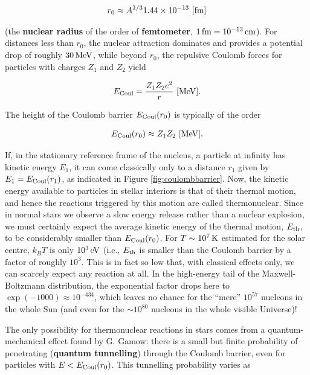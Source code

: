 \documentclass[a4paper,10pt]{article}
\begin{document}
\begin{align*}
    r_0 \approx A^{1/3}1.44\times10^{-13} ~ [{\rm fm}]
\end{align*}

{\noindent}(the \textbf{nuclear radius} of the order of \textbf{femtometer}, $1\,{\rm fm}=10^{-13}\,{\rm cm}$). For distances less than $r_0$, the nuclear attraction dominates and provides a potential drop of roughly $30\,{\rm MeV}$, while beyond $r_0$, the repulsive Coulomb forces for particles with charges $Z_1$ and $Z_2$ yield

\begin{align*}
    E_{\rm Coul} = \frac{Z_1Z_2e^2}{r} ~ [{\rm MeV}].
\end{align*}

{\noindent}The height of the Coulomb barrier $E_{\rm Coul}(r_0)$ is typically of the order

\begin{align*}
    E_{\rm Coul}(r_0) \approx Z_1Z_2 ~ [{\rm MeV}].
\end{align*}

{\noindent}If, in the stationary reference frame of the nucleus, a particle at infinity has kinetic energy $E_1$, it can come classically only to a distance $r_1$ given by $E_1=E_{\rm Coul}(r_1)$, as indicated in Figure \ref{fig:coulombbarrier}. Now, the kinetic energy available to particles in stellar interiors is that of their thermal motion, and hence the reactions triggered by this motion are called thermonuclear. Since in normal stars we observe a slow energy release rather than a nuclear explosion, we must certainly expect the average kinetic energy of the thermal motion, $E_{\rm th}$, to be considerably smaller than $E_{\rm Coul}(r_0)$. For $T\sim10^7\,{\rm K}$ estimated for the solar centre, $k_BT$ is only $10^3\,{\rm eV}$ (i.e., $E_{\rm th}$ is smaller than the Coulomb barrier by a factor of roughly $10^3$. This is in fact so low that, with classical effects only, we can scarcely expect any reaction at all. In the high-energy tail of the Maxwell-Boltzmann distribution, the exponential factor drops here to $\exp(-1000)\approx10^{-434}$, which leaves no chance for the ``mere'' $10^{57}$ nucleons in the whole Sun (and even for the $\sim10^{80}$ nucleons in the whole visible Universe)!

{\noindent}The only possibility for thermonuclear reactions in stars comes from a quantum-mechanical effect found by G. Gamow: there is a small but finite probability of penetrating (\textbf{quantum tunnelling}) through the Coulomb barrier, even for particles with $E<E_{\rm Coul}(r_0)$. This tunnelling probability varies as 
\end{document}
